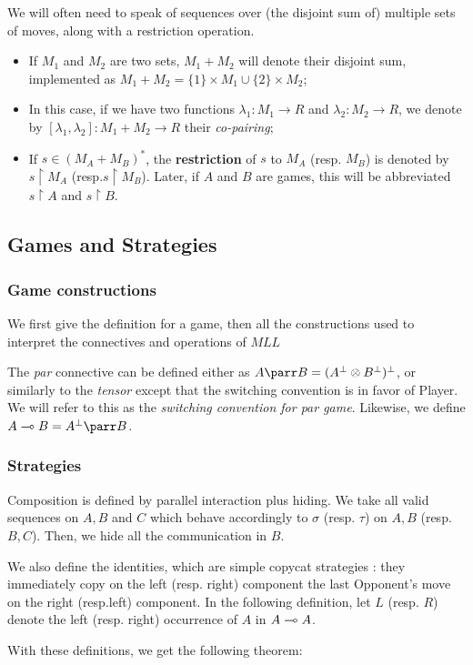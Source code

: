 We will often need to speak of sequences over (the disjoint sum of)
multiple sets of moves, along with a restriction operation.

\begin{itemize}
\tightlist
\item
  If \(M_1\) and \(M_2\) are two sets, \(M_1 + M_2\) will denote their
  disjoint sum, implemented as
  \(M_1 + M_2 = \{1\}\times M_1 \cup \{2\}\times M_2\);
\item
  In this case, if we have two functions \(\lambda_1:M_1 \to R\) and
  \(\lambda_2:M_2\to R\), we denote by
  \([\lambda_1,\lambda_2]:M_1 + M_2 \to R\) their \emph{co-pairing};
\item
  If \(s\in (M_A + M_B)^*\), the \textbf{restriction} of \(s\) to
  \(M_A\) (resp. \(M_B\)) is denoted by \(s\upharpoonright M_A\)
  (resp.\(s \upharpoonright M_B\)). Later, if \(A\) and \(B\) are games,
  this will be abbreviated \(s\upharpoonright A\) and
  \(s\upharpoonright B\).
\end{itemize}

\subsection{Games and Strategies}\label{games-and-strategies}

\subsubsection{Game constructions}\label{game-constructions}

We first give the definition for a game, then all the constructions used
to interpret the connectives and operations of \(MLL\)

The \emph{par} connective can be defined either as
\(A\parr B = (A^\bot \tens B^\bot)^\bot\), or similarly to the
\emph{tensor} except that the switching convention is in favor of
Player. We will refer to this as the \emph{switching convention for par
game}. Likewise, we define \(A\limp B = A
^\bot\parr B\).

\subsubsection{Strategies}\label{strategies}

Composition is defined by parallel interaction plus hiding. We take all
valid sequences on \(A, B\) and \(C\) which behave accordingly to
\(\sigma\) (resp. \(\tau\)) on \(A, B\) (resp. \(B,C\)). Then, we hide
all the communication in \(B\).

We also define the identities, which are simple copycat strategies :
they immediately copy on the left (resp. right) component the last
Opponent's move on the right (resp.left) component. In the following
definition, let \(L\) (resp. \(R\)) denote the left (resp. right)
occurrence of \(A\) in \(A\multimap A\).

With these definitions, we get the following theorem:


